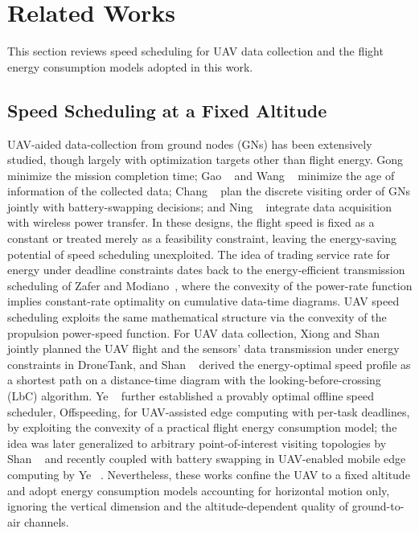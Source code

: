
\section{Related Works}
\label{sec:relatedworks}
This section reviews speed scheduling for UAV data collection and the flight energy consumption models adopted in this work.

\subsection{Speed Scheduling at a Fixed Altitude}

UAV-aided data-collection from ground nodes (GNs) has been extensively studied, though largely with optimization targets other than flight energy.
Gong \etal~\cite{Flight-Time-Minimization} minimize the mission completion time; Gao \etal~\cite{AoI-Sensitive-Data-Collection} and Wang \etal~\cite{Cooperative-Data-Collection} minimize the age of information of the collected data; Chang \etal~\cite{Data-collection-and-offloading} plan the discrete visiting order of GNs jointly with battery-swapping decisions; and Ning \etal~\cite{Wireless-powered-IOT} integrate data acquisition with wireless power transfer.
In these designs, the flight speed is fixed as a constant or treated merely as a feasibility constraint, leaving the energy-saving potential of speed scheduling unexploited.
The idea of trading service rate for energy under deadline constraints dates back to the energy-efficient transmission scheduling of Zafer and Modiano~\cite{A-calculus-Approach}, where the convexity of the power-rate function implies constant-rate optimality on cumulative data-time diagrams.
UAV speed scheduling exploits the same mathematical structure via the convexity of the propulsion power-speed function.
For UAV data collection, Xiong and Shan~\cite{DroneTank} jointly planned the UAV flight and the sensors' data transmission under energy constraints in DroneTank, and Shan \etal~\cite{lbc} derived the energy-optimal speed profile as a shortest path on a distance-time diagram with the looking-before-crossing (LbC) algorithm.
Ye \etal~\cite{offspeeding} further established a provably optimal offline speed scheduler, Offspeeding, for UAV-assisted edge computing with per-task deadlines, by exploiting the convexity of a practical flight energy consumption model; the idea was later generalized to arbitrary point-of-interest visiting topologies by Shan \etal~\cite{Energy-Efficient-POI} and recently coupled with battery swapping in UAV-enabled mobile edge computing by Ye \etal~\cite{Optimal-Flight-Speed-Scheduling-and-Battery-Swapping}.
Nevertheless, these works confine the UAV to a fixed altitude and adopt energy consumption models accounting for horizontal motion only, ignoring the vertical dimension and the altitude-dependent quality of ground-to-air channels.

